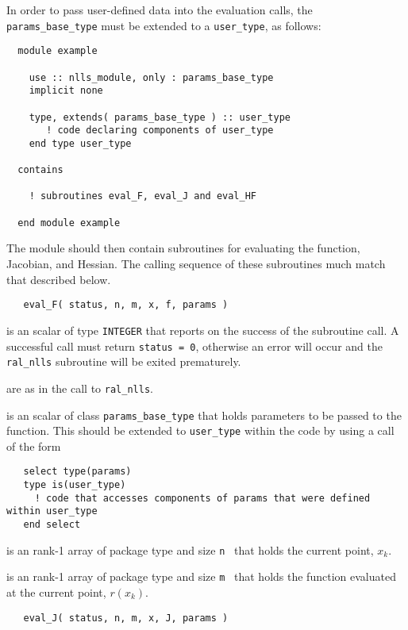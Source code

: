 \documentclass{hslspec}
\newcommand{\scalarintegerio}{is an \intentout scalar of type {\tt INTEGER} }
\newcommand{\ronearrayrealii}[1]{is an \intentin rank-1 array of package type and size {\tt #1}\ }
\newcommand{\ronearrayrealio}[1]{is an \intentout rank-1 array of package type and size {\tt #1}\ }
\begin{document}
In order to pass user-defined data into the evaluation calls, the {\tt params\_base\_type} must be extended to a {\tt user\_type}, as follows:
\begin{verbatim}
  module example

    use :: nlls_module, only : params_base_type
    implicit none

    type, extends( params_base_type ) :: user_type
       ! code declaring components of user_type 
    end type user_type
  
  contains 

    ! subroutines eval_F, eval_J and eval_HF

  end module example
\end{verbatim}
The module should then contain subroutines for evaluating the function, Jacobian, and Hessian.
The calling sequence of these subroutines much match that described below.

\begin{verbatim}
   eval_F( status, n, m, x, f, params )
\end{verbatim}

\begin{description}
   \scalarintegerio that reports on the success of the subroutine call.  A successful call must return {\tt status = 0}, otherwise an error will occur and the {\tt ral\_nlls} subroutine will be exited prematurely.

   are as in the call to {\tt ral\_nlls}.

   is an \intentin scalar of class {\tt params\_base\_type} that holds parameters to be passed to the function.  This should be extended to {\tt user\_type} within the code by using a call of the form
\begin{verbatim}
   select type(params)
   type is(user_type)
     ! code that accesses components of params that were defined within user_type 
   end select
\end{verbatim}

   \ronearrayrealii{n} that holds the current point, $x_k$.
  
   \ronearrayrealio{m} that holds the function evaluated at the current point, $r(x_k)$.
  
\end{description}

\begin{verbatim}
   eval_J( status, n, m, x, J, params )
\end{verbatim}
\end{document}
